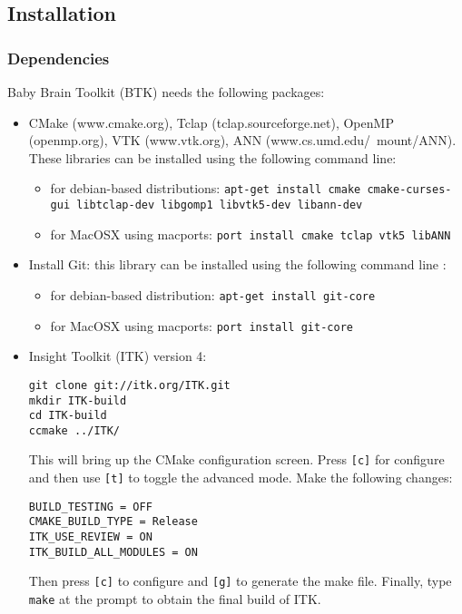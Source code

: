 \documentclass[a4paper,10pt]{article}
\begin{document}
\subsection{Installation}

\subsubsection{Dependencies}

Baby Brain Toolkit (BTK) needs the following packages:
\begin{itemize}
 \item CMake (www.cmake.org), Tclap (tclap.sourceforge.net), OpenMP (openmp.org), VTK (www.vtk.org), ANN (www.cs.umd.edu/\string~mount/ANN). These libraries can be installed using the following command line: 
 \begin{itemize}
 \item for debian-based distributions: \texttt{apt-get install cmake cmake-curses-gui libtclap-dev libgomp1 libvtk5-dev libann-dev}
 \item for MacOSX using macports: \texttt{port install cmake tclap vtk5 libANN}
 \end{itemize}
 \item Install Git: this library can be installed using the following command line : 
 \begin{itemize}
 \item for debian-based distribution: \texttt{apt-get install git-core}
 \item for MacOSX using macports: \texttt{port install git-core}
 \end{itemize}
 \item Insight Toolkit (ITK) version 4:
\begin{verbatim}
git clone git://itk.org/ITK.git
mkdir ITK-build
cd ITK-build
ccmake ../ITK/
\end{verbatim}
This will bring up the CMake configuration screen. Press \texttt{[c]} for configure and then use \texttt{[t]} to toggle the advanced mode. Make the following changes:
\begin{verbatim}
BUILD_TESTING = OFF
CMAKE_BUILD_TYPE = Release
ITK_USE_REVIEW = ON
ITK_BUILD_ALL_MODULES = ON
\end{verbatim}
Then press \texttt{[c]} to configure and \texttt{[g]} to generate the make file. Finally, type \texttt{make} at the prompt to obtain the final build of ITK.

\end{itemize}
\end{document}
